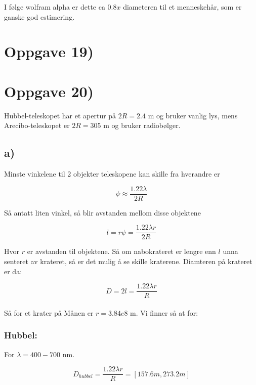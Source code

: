 \documentclass[a4paper,norsk, 10pt]{article}
\begin{document}
I følge wolfram alpha er dette ca $0.8x$ diameteren til et menneskehår, som er ganske god estimering.


\section*{Oppgave 19)}



\section*{Oppgave 20)}

Hubbel-teleskopet har et apertur på $2R = 2.4$ m og bruker vanlig lys, mens Arecibo-teleskopet er $2R = 305$ m og bruker radiobølger.

\subsection*{a)}

Minste vinkelene til 2 objekter teleskopene kan skille fra hverandre er 

\begin{equation}
\psi \approx \frac{1.22\lambda}{2R}
\end{equation}

Så antatt liten vinkel, så blir avstanden mellom disse objektene

\begin{equation}
l = r\psi = \frac{1.22\lambda r}{2R}
\label{eq:l}
\end{equation}

Hvor $r$ er avstanden til objektene. Så om nabokrateret er lengre enn $l$ unna senteret av krateret, så er det mulig å se skille kraterene. Diamteren på krateret er da:

\begin{equation}
D = 2l = \frac{1.22\lambda r}{R}
\label{eq:D}
\end{equation}\\



Så for et krater på Månen er $r = 3.84e8$ m. Vi finner så at for:

\subsubsection*{Hubbel:}

For $\lambda = 400 - 700$ nm.

\begin{equation}
D_{hubbel} = \frac{1.22\lambda r}{R} = [157.6 m,273.2m]
\end{equation}
\end{document}
